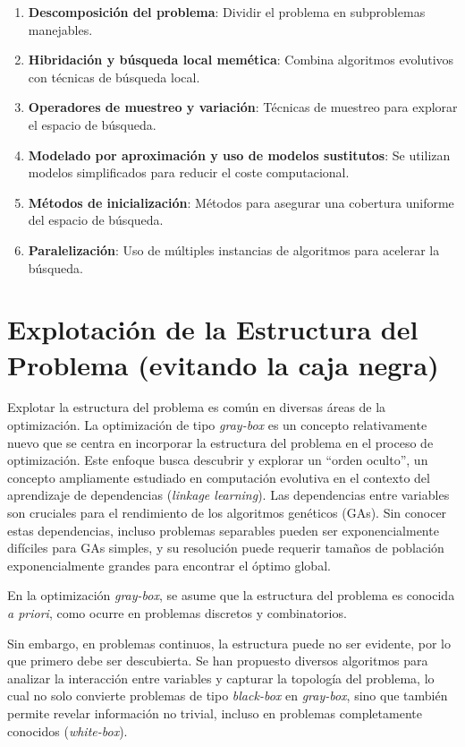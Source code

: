 \begin{enumerate}
    \item \textbf{Descomposición del problema}: Dividir el problema en subproblemas manejables.
    \item \textbf{Hibridación y búsqueda local memética}: Combina algoritmos evolutivos con técnicas de búsqueda local.
    \item \textbf{Operadores de muestreo y variación}: Técnicas de muestreo para explorar el espacio de búsqueda.
    \item \textbf{Modelado por aproximación y uso de modelos sustitutos}: Se utilizan modelos simplificados para reducir el coste computacional.
    \item \textbf{Métodos de inicialización}: Métodos para asegurar una cobertura uniforme del espacio de búsqueda.
    \item \textbf{Paralelización}: Uso de múltiples instancias de algoritmos para acelerar la búsqueda.
\end{enumerate}

\section{Explotación de la Estructura del Problema (evitando la caja negra)}

Explotar la estructura del problema es común en diversas áreas de la optimización. La optimización de tipo \textit{gray-box} es un concepto relativamente nuevo que se centra en incorporar la estructura del problema en el proceso de optimización. Este enfoque busca descubrir y explorar un “orden oculto”, un concepto ampliamente estudiado en computación evolutiva en el contexto del aprendizaje de dependencias (\textit{linkage learning}). Las dependencias entre variables son cruciales para el rendimiento de los algoritmos genéticos (GAs). Sin conocer estas dependencias, incluso problemas separables pueden ser exponencialmente difíciles para GAs simples, y su resolución puede requerir tamaños de población exponencialmente grandes para encontrar el óptimo global.

En la optimización \textit{gray-box}, se asume que la estructura del problema es conocida \textit{a priori}, como ocurre en problemas discretos y combinatorios.

Sin embargo, en problemas continuos, la estructura puede no ser evidente, por lo que primero debe ser descubierta. Se han propuesto diversos algoritmos para analizar la interacción entre variables y capturar la topología del problema, lo cual no solo convierte problemas de tipo \textit{black-box} en \textit{gray-box}, sino que también permite revelar información no trivial, incluso en problemas completamente conocidos (\textit{white-box}).

